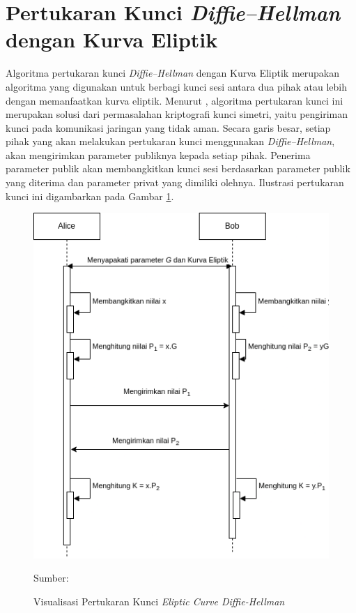 \section{Pertukaran Kunci \emph{Diffie–Hellman} dengan Kurva Eliptik}
Algoritma pertukaran kunci \emph{Diffie–Hellman} dengan Kurva Eliptik merupakan algoritma yang digunakan untuk berbagi kunci sesi antara dua pihak atau lebih dengan memanfaatkan kurva eliptik. Menurut \textcite{munir2019}, algoritma pertukaran kunci ini merupakan solusi dari permasalahan kriptografi kunci simetri, yaitu pengiriman kunci pada komunikasi jaringan yang tidak aman. Secara garis besar, setiap pihak yang akan melakukan pertukaran kunci menggunakan \emph{Diffie–Hellman}, akan mengirimkan parameter publiknya kepada setiap pihak. Penerima parameter publik akan membangkitkan kunci sesi berdasarkan parameter publik yang diterima dan parameter privat yang dimiliki olehnya. Ilustrasi pertukaran kunci ini digambarkan pada Gambar \ref{fig:crypto.ecdh}.

\begin{figure}[!h]
  \centering
  \includegraphics[width=12cm]{chapters/res/chapter-2/img/crypto.ecdh.png}
  \caption{Visualisasi Pertukaran Kunci \emph{Eliptic Curve Diffie-Hellman}} \label{fig:crypto.ecdh}
  Sumber: \textcite{munir2019}
\end{figure}

